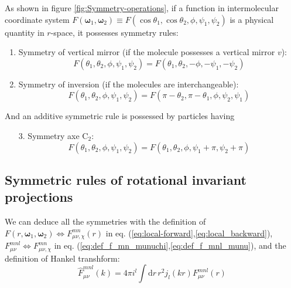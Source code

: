 As shown in figure \ref{fig:Symmetry-operations}, if a function in
intermolecular coordinate system $F(\boldsymbol{\omega}_{1},\boldsymbol{\omega}_{2})\equiv F(\cos\theta_{1},\cos\theta_{2},\phi,\psi_{1},\psi_{2})$
is a physical quantity in $r$-space, it possesses symmetry rules:
\begin{enumerate}
\item Symmetry of vertical mirror (if the molecule possesses a vertical
mirror $v$): 
\begin{equation}
F(\theta_{1},\theta_{2},\phi,\psi_{1},\psi_{2})=F(\theta_{1},\theta_{2},-\phi,-\psi_{1},-\psi_{2})\label{eq:symm_dcf_1}
\end{equation}
\item Symmetry of inversion (if the molecules are interchangeable): 
\begin{equation}
F(\theta_{1},\theta_{2},\phi,\psi_{1},\psi_{2})=F(\pi-\theta_{2},\pi-\theta_{1},\phi,\psi_{2},\psi_{1})\label{eq:symm_dcf_2}
\end{equation}
\end{enumerate}
And an additive symmetric rule is possessed by particles having 
\begin{enumerate}
\item [3.]Symmetry axe $\mathrm{C}_{2}$: 
\begin{equation}
F(\theta_{1},\theta_{2},\phi,\psi_{1},\psi_{2})=F(\theta_{1},\theta_{2},\phi,\psi_{1}+\pi,\psi_{2}+\pi)
\end{equation}
\end{enumerate}

\subsection{Symmetric rules of rotational invariant projections}

We can deduce all the symmetries with the definition of $F(r,\boldsymbol{\omega}_{1},\boldsymbol{\omega}_{2})\Leftrightarrow F_{\mu\nu,\chi}^{mn}(r)$
in eq. (\ref{eq:local-forward},\ref{eq:local_backward}), $F_{\mu\nu}^{mnl}\Leftrightarrow F_{\mu\nu,\chi}^{mn}$
in eq. (\ref{eq:def_f_mn_munuchi},\ref{eq:def_f_mnl_munu}), and
the definition of Hankel transhform:
\begin{equation}
\hat{F}_{\mu\nu}^{mnl}(k)=4\pi i^{l}\int\mathrm{d}r\,r^{2}j_{l}(kr)F_{\mu\nu}^{mnl}(r)\label{eq:hankel}
\end{equation}

